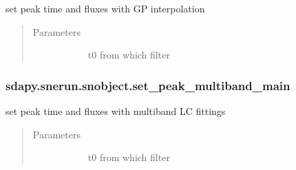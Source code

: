 \documentclass[letterpaper,10pt,english]{sphinxmanual}
\begin{document}
\begin{fulllineitems}
\begin{fulllineitems}
\label{\detokenize{generated/sdapy.snerun.snobject.set_peak_gp:sdapy.snerun.snobject.set_peak_gp}}
set peak time and fluxes with GP interpolation
\begin{quote}\begin{description}
\item[{Parameters}] \leavevmode\begin{description}
\item[{}] \leavevmode{[}\sphinxtitleref{str}{]}
t0 from which filter

\end{description}

\end{description}\end{quote}

\end{fulllineitems}



\subsubsection{sdapy.snerun.snobject.set\_peak\_multiband\_main}
\label{\detokenize{generated/sdapy.snerun.snobject.set_peak_multiband_main:sdapy-snerun-snobject-set-peak-multiband-main}}\label{\detokenize{generated/sdapy.snerun.snobject.set_peak_multiband_main::doc}}

\begin{fulllineitems}
\label{\detokenize{generated/sdapy.snerun.snobject.set_peak_multiband_main:sdapy.snerun.snobject.set_peak_multiband_main}}
set peak time and fluxes with multiband LC fittings
\begin{quote}\begin{description}
\item[{Parameters}] \leavevmode\begin{description}
\item[{}] \leavevmode{[}\sphinxtitleref{str}{]}
t0 from which filter


\end{description}
\end{description}
\end{quote}
\end{fulllineitems}
\end{fulllineitems}
\end{document}
